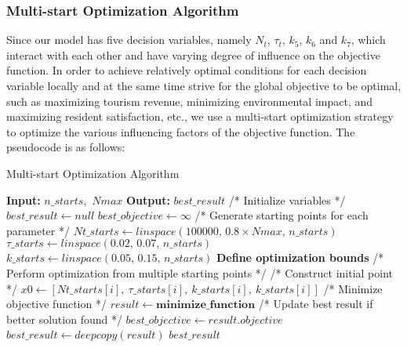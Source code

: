 \documentclass[12pt]{article}  %
\begin{document}
\subsubsection{Multi-start Optimization Algorithm}
Since our model has five decision variables, namely \(N_t\), \(\tau_t\), \(k_5\), \(k_6\) and \(k_7\), which interact with each other and have varying degree of influence on the objective function. In order to achieve relatively optimal conditions for each decision variable locally and at the same time strive for the global objective to be optimal, such as maximizing tourism revenue, minimizing environmental impact, and maximizing resident satisfaction, etc., we use a multi-start optimization strategy to optimize the various influencing factors of the objective function. The pseudocode is as follows:
\begin{algorithm}
	\caption{Multi-start Optimization Algorithm}
	\begin{algorithmic}[1]
		\STATE \textbf{Input:} $n\_starts$,\ $Nmax$
		\STATE \textbf{Output:} $best\_result$
		\vspace{0.2cm}
		\STATE /* Initialize variables */
		\STATE $best\_result\leftarrow null$
		\STATE $best\_objective\leftarrow \infty$
		\STATE /* Generate starting points for each parameter */
		\STATE $Nt\_starts\leftarrow linspace(100000,\,0.8\times Nmax,\,n\_starts)$
		\STATE $\tau\_starts\leftarrow linspace(0.02,\,0.07,\,n\_starts)$
		\STATE $k\_starts\leftarrow linspace(0.05,\,0.15,\,n\_starts)$
		\vspace{0.2cm}
		\STATE \textbf{Define optimization bounds}
		\vspace{0.2cm}
		\STATE /* Perform optimization from multiple starting points */
		\STATE /* Construct initial point */
		\STATE $x0\leftarrow [Nt\_starts[i],\ \tau\_starts[i],\ k\_starts[i],\ k\_starts[i]]$
		\STATE /* Minimize objective function */
		\STATE $result\leftarrow \textbf{minimize\_function}$
		\STATE /* Update best result if better solution found */
		\STATE $best\_objective\leftarrow result.objective$
		\STATE $best\_result\leftarrow deepcopy(result)$
		\ENDIF
		\ENDFOR
		\vspace{0.2cm}
		\RETURN $best\_result$
	\end{algorithmic}
\end{algorithm}
\end{document}
